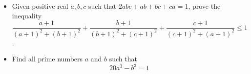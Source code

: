 \documentclass[12pt]{article}
\begin{document}
\begin{itemize}
\item %
Given positive real $a,b,c$ such that $2abc+ab+bc+ca=1$, prove the inequality
\begin{equation*}
\frac{a+1}{(a+1)^2+(b+1)^2}+\frac{b+1}{(b+1)^2+(c+1)^2}+\frac{c+1}{(c+1)^2+(a+1)^2}\leq 1
\end{equation*}.

\item %
Find all prime numbers $a$ and $b$ such that
\begin{equation*}
20a^3-b^3=1
\end{equation*}


\end{itemize}

\vfill

\centering
\begin{BVerbatim}
\end{BVerbatim}
\end{document}
